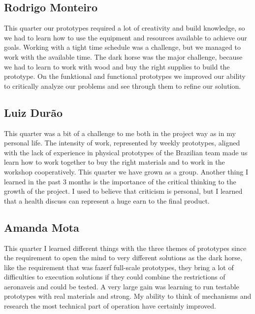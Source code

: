 \subsection{Rodrigo Monteiro}
This quarter our prototypes required a lot of creativity and build knowledge, so we had to learn how to use the equipment and resources available to achieve our goals. Working with a tight time schedule was a challenge, but we managed to work with the available time. The dark horse was the major challenge, because we had to learn to work with wood and buy the right supplies to build the prototype. On the funktional and functional prototypes we improved our ability to critically analyze our problems and see through them to refine our solution.

\subsection{Luiz Durão}
This quarter was a bit of a challenge to me both in the project way as in my personal life. The intensity of work, represented by weekly prototypes, aligned with the lack of experience in physical prototypes of the Brazilian team made us learn how to work together to buy the right materials and to work in the workshop cooperatively. This quarter we have grown as a group. Another  thing I learned in the past 3 months is the importance of the critical thinking to the growth of the project. I used to believe that criticism is personal, but I learned that a health discuss can represent a huge earn to the final product. 

\subsection{Amanda Mota}

This quarter I learned different things with the three themes of prototypes since the requirement to open the mind to very different solutions as the dark horse, like the requirement that was fazerf full-scale prototypes, they bring a lot of difficulties to execution solutions if they could combine the restrictions of aeronaveis and could be tested. 
A very large gain was learning to run testable prototypes with real materials and strong. My ability to think of mechanisms and research the most technical part of operation have certainly improved.

